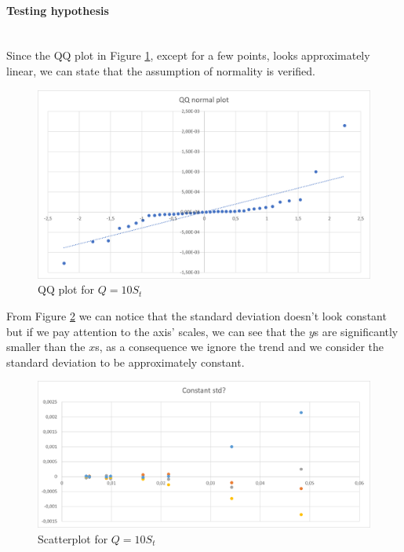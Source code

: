 \documentclass{article}
\begin{document}
                \paragraph{Testing hypothesis} \hfill \\
                    Since the QQ plot in Figure \ref{fig:QQplot_10}, except for a few points, looks approximately linear, we can state that the assumption of normality is verified.
                    
                    \begin{figure}[htbp]
                        \centering
                        \includegraphics[scale=0.6]{images/QQplot_10.png}
                        \caption{QQ plot for $Q = 10 S_t$}
                        \label{fig:QQplot_10}
                    \end{figure}
                    
                    From Figure \ref{fig:standardDeviation_10} we can notice that the standard deviation doesn't look constant but if we pay attention to the axis' scales, we can see that the $y$s are significantly smaller than the $x$s, as a consequence we ignore the trend and we consider the standard deviation to be approximately constant.
                    
                    \begin{figure}[htbp]
                        \centering
                        \includegraphics[scale=0.6]{images/standardDeviation_10.png}
                        \caption{Scatterplot for $Q = 10 S_t$}
                        \label{fig:standardDeviation_10}
                    \end{figure}
        
\end{document}
